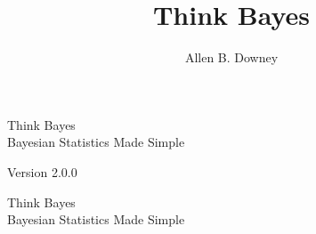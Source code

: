 \documentclass[12pt]{book}
\title{Think Bayes}
\author{Allen B. Downey}
\theoremstyle{exercise}
\newcommand{\thetitle}{Think Bayes}
\newcommand{\thesubtitle}{Bayesian Statistics Made Simple}
\newcommand{\theversion}{2.0.0}
\newif\ifplastex
\begin{document}
\frontmatter


\newcommand{\PMF}{\mathrm{PMF}}
\newcommand{\PDF}{\mathrm{PDF}}
\newcommand{\CDF}{\mathrm{CDF}}
\newcommand{\ICDF}{\mathrm{ICDF}}

\ifplastex
    \usepackage{localdef}
    \maketitle

\newcount\anchorcnt
\newcommand*{\Anchor}[1]{%
  \@bsphack%
    \Hy@GlobalStepCount\anchorcnt%
    \edef\@currentHref{anchor.\the\anchorcnt}%
    \Hy@raisedlink{\hyper@anchorstart{\@currentHref}\hyper@anchorend}%
    \M@gettitle{}\label{#1}%
    \@esphack%
}
\else

\begin{latexonly}

\renewcommand{\topfraction}{0.9}
\renewcommand{\blankpage}{\thispagestyle{empty} \quad \newpage}


\thispagestyle{empty}

\begin{flushright}
\vspace*{2.0in}

\begin{spacing}{3}
{\huge \thetitle}\\
{\Large \thesubtitle}
\end{spacing}

\vspace{0.25in}

Version \theversion

\vfill

\end{flushright}


\blankpage
\blankpage

\pagebreak
\thispagestyle{empty}

\begin{flushright}
\vspace*{2.0in}

\begin{spacing}{3}
{\huge \thetitle}\\
{\Large \thesubtitle}
\end{spacing}


\end{flushright}
\end{latexonly}
\end{document}
